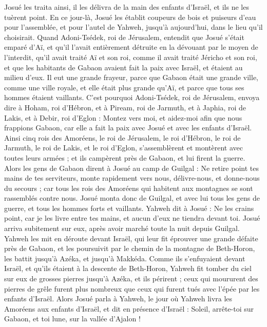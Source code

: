 \begin{multicols}{2}
Josué les traita ainsi, il les délivra de la main des enfants d’Israël, et ils ne les tuèrent point.
En ce jour-là, Josué les établit coupeurs de bois et puiseurs d’eau pour l’assemblée, et pour l’autel de Yahweh, jusqu’à aujourd’hui, dans le lieu qu’il choisirait.
\VerseOne{}Quand Adoni-Tsédek, roi de Jérusalem, entendit que Josué s’était emparé d’Aï, et qu’il l’avait entièrement détruite en la dévouant par le moyen de l'interdit, qu’il avait traité Aï et son roi, comme il avait traité Jéricho et son roi, et que les habitants de Gabaon avaient fait la paix avec Israël, et étaient au milieu d’eux.
Il eut une grande frayeur, parce que Gabaon était une grande ville, comme une ville royale, et elle était plus grande qu’Aï, et parce que tous ses hommes étaient vaillants.
C’est pourquoi Adoni-Tsédek, roi de Jérusalem, envoya dire à Hoham, roi d’Hébron, et à Piream, roi de Jarmuth, et à Japhia, roi de Lakis, et à Debir, roi d’Eglon :
Montez vers moi, et aidez-moi afin que nous frappions Gabaon, car elle a fait la paix avec Josué et avec les enfants d’Israël.
Ainsi cinq rois des Amoréens, le roi de Jérusalem, le roi d’Hébron, le roi de Jarmuth, le roi de Lakis, et le roi d’Eglon, s’assemblèrent et montèrent avec toutes leurs armées ; et ils campèrent près de Gabaon, et lui firent la guerre.
Alors les gens de Gabaon dirent à Josué au camp de Guilgal : Ne retire point tes mains de tes serviteurs, monte rapidement vers nous, délivre-nous, et donne-nous du secours ; car tous les rois des Amoréens qui habitent aux montagnes se sont rassemblés contre nous.
Josué monta donc de Guilgal, et avec lui tous les gens de guerre, et tous les hommes forts et vaillants.
Yahweh dit à Josué : Ne les crains point, car je les livre entre tes mains, et aucun d’eux ne tiendra devant toi.
Josué arriva subitement sur eux, après avoir marché toute la nuit depuis Guilgal.
Yahweh les mit en déroute devant Israël, qui leur fit éprouver une grande défaite près de Gabaon, et les poursuivit par le chemin de la montagne de Beth-Horon, les battit jusqu’à Azéka, et jusqu’à Makkéda.
Comme ils s’enfuyaient devant Israël, et qu’ils étaient à la descente de Beth-Horon, Yahweh fit tomber du ciel sur eux de grosses pierres jusqu’à Azéka, et ils périrent ; ceux qui moururent des pierres de grêle furent plus nombreux que ceux qui furent tués avec l’épée par les enfants d’Israël.
Alors Josué parla à Yahweh, le jour où Yahweh livra les Amoréens aux enfants d’Israël, et dit en présence d’Israël : Soleil, arrête-toi sur Gabaon, et toi lune, sur la vallée d’Ajalon !

\end{multicols}

